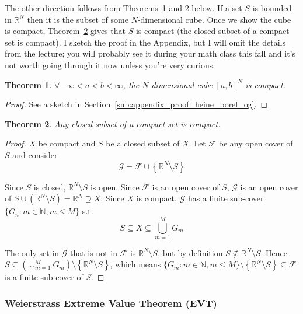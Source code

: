 \documentclass{article}
\theoremstyle{mythm}
\newtheorem{theorem}{Theorem}
\theoremstyle{mydef}
\begin{document}
The other direction follows from Theorems~\ref{thm:lecture3_compactness_heine_borel_og} and \ref{thm:lecture3_compactness_closed_compact} below. If a set $S$ is bounded in $\mathbb{R}^N$ then it is the subset of some $N$-dimensional cube. Once we show the cube is compact, Theorem~\ref{thm:lecture3_compactness_closed_compact} gives that $S$ is compact (the closed subset of a compact set is compact). I sketch the proof in the Appendix, but I will omit the details from the lecture; you will probably see it during your math class this fall and it's not worth going through it now unless you're very curious.
\begin{theorem}\label{thm:lecture3_compactness_heine_borel_og}
  $\forall -\infty < a < b < \infty$, the $N$-dimensional cube $[a, b]^N$ is compact.
\end{theorem}

\begin{proof}
  See a sketch in Section~\ref{sub:appendix_proof_heine_borel_og}.
\end{proof}

\begin{theorem}\label{thm:lecture3_compactness_closed_compact}
  Any closed subset of a compact set is compact.
\end{theorem}

\begin{proof}
  $X$ be compact and $S$ be a closed subset of $X$. Let $\mathcal{F}$ be any open cover of $S$ and consider
  \[
    \mathcal{G} = \mathcal{F} \cup \left\{\mathbb{R}^N \setminus S\right\}
  \]

  Since $S$ is closed, $\mathbb{R}^N \setminus S$ is open. Since $\mathcal{F}$ is an open cover of $S$, $\mathcal{G}$ is an open cover of $S \cup (\mathbb{R}^N \setminus S) = \mathbb{R}^N \supseteq X$. Since $X$ is compact, $\mathcal{G}$ has a finite sub-cover $\{G_n: m \in \mathbb{N}, m \le M\}$ s.t.
  \[
    S \subseteq X \subseteq \bigcup_{m = 1}^M G_m
  \]

  The only set in $\mathcal{G}$ that is not in $\mathcal{F}$ is $\mathbb{R}^N \setminus S$, but by definition $S \not\subseteq \mathbb{R}^N \setminus S$. Hence $S \subseteq \left(\cup_{m = 1}^M G_m \right) \setminus \left\{\mathbb{R}^N \setminus S\right\}$, which means $\{G_m: m \in \mathbb{N}, m \le M\} \setminus \left\{\mathbb{R}^N \setminus S\right\} \subseteq \mathcal{F}$ is a finite sub-cover of $S$.
\end{proof}

\subsubsection{Weierstrass Extreme Value Theorem (EVT)}
\label{ssub:weierstrass_extreme_value_theorem_evt_}
\end{document}
